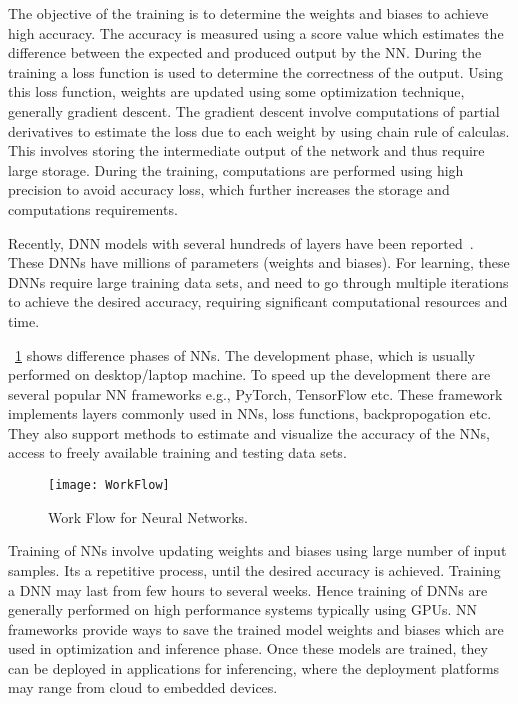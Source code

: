 The objective of the training is to determine the weights and biases to achieve high accuracy. The accuracy is measured using a score value which estimates the difference between the expected and produced output by the NN. During the training a loss function is used to determine the correctness of the output. Using this loss function, weights are updated using some optimization technique, generally gradient descent. The gradient descent involve computations of partial derivatives to estimate the loss due to each weight by using chain rule of calculas. This involves storing the intermediate output of the network and thus require large storage. During the training, computations are performed using high precision to avoid accuracy loss, which further increases the storage and computations requirements.

Recently, DNN models with several hundreds of layers have been reported~\cite{he2016deep}. These DNNs have millions of parameters (weights and biases). For learning, these DNNs require large training data sets, and need to go through multiple iterations to achieve the desired accuracy, requiring significant computational resources and time. 

\figurename{~\ref{fig:workFlow}} shows difference phases of NNs. The development phase, which is usually performed on desktop/laptop machine. To speed up the development there are several popular NN frameworks e.g., PyTorch, TensorFlow etc. These framework implements layers commonly used in NNs, loss functions, backpropogation etc. They also support  methods to estimate and visualize the accuracy of the NNs, access to freely available training and testing data sets. 
\begin{figure}[!htb]
	\centering
	\captionsetup{font=sf}
	\texttt{[image: WorkFlow]}
	\caption{Work Flow for Neural Networks.}
	\label{fig:workFlow}
\end{figure}

Training of NNs involve updating weights and biases using large number of input samples. Its a repetitive process, until the desired accuracy is achieved. Training a DNN may last from few hours to several weeks. Hence training of DNNs are generally performed on high performance systems typically using GPUs. NN frameworks provide ways to save the trained model weights and biases which are used in optimization and inference phase. Once these models are trained, they can be deployed in applications for inferencing, where the deployment platforms may range from cloud to embedded devices. 

